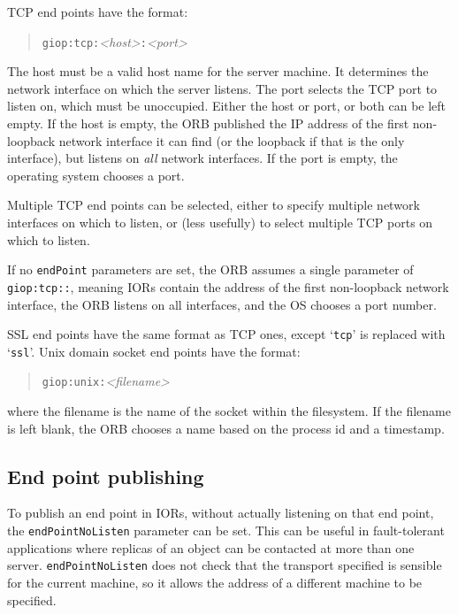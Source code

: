 \documentclass[11pt,twoside,a4paper]{book}
\newcommand{\code}[1]{\texttt{#1}}
\begin{document}
TCP end points have the format:

\begin{quote}
\code{giop:tcp:}\textit{<host>}\code{:}\textit{<port>}
\end{quote}

\noindent The host must be a valid host name for the server machine.
It determines the network interface on which the server listens. The
port selects the TCP port to listen on, which must be unoccupied.
Either the host or port, or both can be left empty. If the host is
empty, the ORB published the IP address of the first non-loopback
network interface it can find (or the loopback if that is the only
interface), but listens on \emph{all} network interfaces. If the port
is empty, the operating system chooses a port.

Multiple TCP end points can be selected, either to specify multiple
network interfaces on which to listen, or (less usefully) to select
multiple TCP ports on which to listen.

If no \code{endPoint} parameters are set, the ORB assumes a single
parameter of \code{giop:tcp::}, meaning IORs contain the address of
the first non-loopback network interface, the ORB listens on all
interfaces, and the OS chooses a port number.

SSL end points have the same format as TCP ones, except `\code{tcp}'
is replaced with `\code{ssl}'. Unix domain socket end points have the
format:

\begin{quote}
\code{giop:unix:}\textit{<filename>}
\end{quote}

\noindent where the filename is the name of the socket within the
filesystem. If the filename is left blank, the ORB chooses a name
based on the process id and a timestamp.


\subsection{End point publishing}

To publish an end point in IORs, without actually listening on that
end point, the \code{endPointNoListen} parameter can be set. This can
be useful in fault-tolerant applications where replicas of an object
can be contacted at more than one server. \code{endPointNoListen} does
not check that the transport specified is sensible for the current
machine, so it allows the address of a different machine to be
specified.
\end{document}
